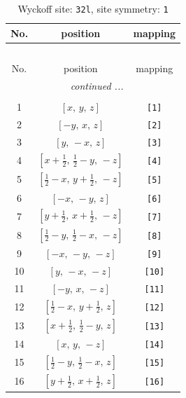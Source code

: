 \documentclass[fleqn,8pt]{jsarticle}
\begin{document}
\renewcommand{\arraystretch}{1.2}
\begin{longtable}{ccc}
\caption{Wyckoff site: {\tt 32l}, site symmetry: {\tt 1}}
 \\
 \hline \hline
No. & position & mapping \\ \hline \endfirsthead

\multicolumn{2}{l}{\tablename\ \thetable{}} \\
 \hline \hline
No. & position & mapping \\ \hline \endhead

 \hline \hline
\multicolumn{2}{r}{\footnotesize\it continued ...} \\ \endfoot

 \hline \hline
\multicolumn{2}{r}{} \\ \endlastfoot

1 & $\left[ x,\, y,\, z \right]$ & {\tt [1]} \\ \hline
2 & $\left[ - y,\, x,\, z \right]$ & {\tt [2]} \\ \hline
3 & $\left[ y,\, - x,\, z \right]$ & {\tt [3]} \\ \hline
4 & $\left[ x + \frac{1}{2},\, \frac{1}{2} - y,\, - z \right]$ & {\tt [4]} \\ \hline
5 & $\left[ \frac{1}{2} - x,\, y + \frac{1}{2},\, - z \right]$ & {\tt [5]} \\ \hline
6 & $\left[ - x,\, - y,\, z \right]$ & {\tt [6]} \\ \hline
7 & $\left[ y + \frac{1}{2},\, x + \frac{1}{2},\, - z \right]$ & {\tt [7]} \\ \hline
8 & $\left[ \frac{1}{2} - y,\, \frac{1}{2} - x,\, - z \right]$ & {\tt [8]} \\ \hline
9 & $\left[ - x,\, - y,\, - z \right]$ & {\tt [9]} \\ \hline
10 & $\left[ y,\, - x,\, - z \right]$ & {\tt [10]} \\ \hline
11 & $\left[ - y,\, x,\, - z \right]$ & {\tt [11]} \\ \hline
12 & $\left[ \frac{1}{2} - x,\, y + \frac{1}{2},\, z \right]$ & {\tt [12]} \\ \hline
13 & $\left[ x + \frac{1}{2},\, \frac{1}{2} - y,\, z \right]$ & {\tt [13]} \\ \hline
14 & $\left[ x,\, y,\, - z \right]$ & {\tt [14]} \\ \hline
15 & $\left[ \frac{1}{2} - y,\, \frac{1}{2} - x,\, z \right]$ & {\tt [15]} \\ \hline
16 & $\left[ y + \frac{1}{2},\, x + \frac{1}{2},\, z \right]$ & {\tt [16]} \\ \hline

\end{longtable}
\end{document}

